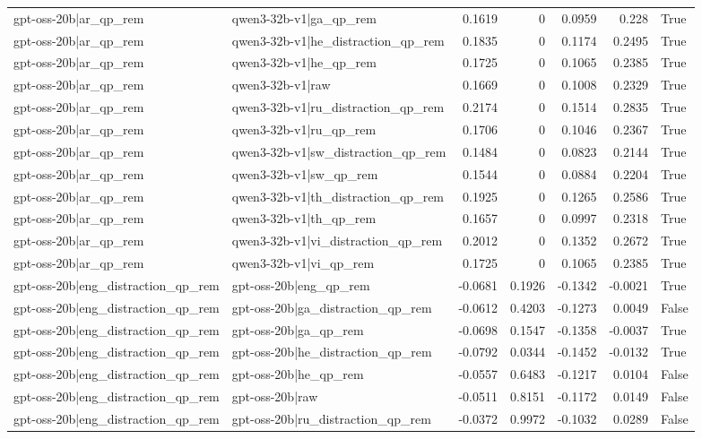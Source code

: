 \begin{table}
\begin{tabular}{l l r r r r l}
gpt-oss-20b|ar_qp_rem & qwen3-32b-v1|ga_qp_rem & 0.1619 & 0 & 0.0959 & 0.228 & True \\
gpt-oss-20b|ar_qp_rem & qwen3-32b-v1|he_distraction_qp_rem & 0.1835 & 0 & 0.1174 & 0.2495 & True \\
gpt-oss-20b|ar_qp_rem & qwen3-32b-v1|he_qp_rem & 0.1725 & 0 & 0.1065 & 0.2385 & True \\
gpt-oss-20b|ar_qp_rem & qwen3-32b-v1|raw & 0.1669 & 0 & 0.1008 & 0.2329 & True \\
gpt-oss-20b|ar_qp_rem & qwen3-32b-v1|ru_distraction_qp_rem & 0.2174 & 0 & 0.1514 & 0.2835 & True \\
gpt-oss-20b|ar_qp_rem & qwen3-32b-v1|ru_qp_rem & 0.1706 & 0 & 0.1046 & 0.2367 & True \\
gpt-oss-20b|ar_qp_rem & qwen3-32b-v1|sw_distraction_qp_rem & 0.1484 & 0 & 0.0823 & 0.2144 & True \\
gpt-oss-20b|ar_qp_rem & qwen3-32b-v1|sw_qp_rem & 0.1544 & 0 & 0.0884 & 0.2204 & True \\
gpt-oss-20b|ar_qp_rem & qwen3-32b-v1|th_distraction_qp_rem & 0.1925 & 0 & 0.1265 & 0.2586 & True \\
gpt-oss-20b|ar_qp_rem & qwen3-32b-v1|th_qp_rem & 0.1657 & 0 & 0.0997 & 0.2318 & True \\
gpt-oss-20b|ar_qp_rem & qwen3-32b-v1|vi_distraction_qp_rem & 0.2012 & 0 & 0.1352 & 0.2672 & True \\
gpt-oss-20b|ar_qp_rem & qwen3-32b-v1|vi_qp_rem & 0.1725 & 0 & 0.1065 & 0.2385 & True \\
gpt-oss-20b|eng_distraction_qp_rem & gpt-oss-20b|eng_qp_rem & -0.0681 & 0.1926 & -0.1342 & -0.0021 & True \\
gpt-oss-20b|eng_distraction_qp_rem & gpt-oss-20b|ga_distraction_qp_rem & -0.0612 & 0.4203 & -0.1273 & 0.0049 & False \\
gpt-oss-20b|eng_distraction_qp_rem & gpt-oss-20b|ga_qp_rem & -0.0698 & 0.1547 & -0.1358 & -0.0037 & True \\
gpt-oss-20b|eng_distraction_qp_rem & gpt-oss-20b|he_distraction_qp_rem & -0.0792 & 0.0344 & -0.1452 & -0.0132 & True \\
gpt-oss-20b|eng_distraction_qp_rem & gpt-oss-20b|he_qp_rem & -0.0557 & 0.6483 & -0.1217 & 0.0104 & False \\
gpt-oss-20b|eng_distraction_qp_rem & gpt-oss-20b|raw & -0.0511 & 0.8151 & -0.1172 & 0.0149 & False \\
gpt-oss-20b|eng_distraction_qp_rem & gpt-oss-20b|ru_distraction_qp_rem & -0.0372 & 0.9972 & -0.1032 & 0.0289 & False \\

\end{tabular}
\end{table}
